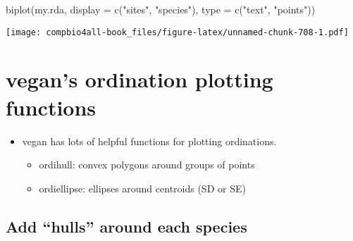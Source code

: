 \documentclass[
]{book}
\newenvironment{Shaded}{\begin{snugshade}}{\end{snugshade}}
\newcommand{\AttributeTok}[1]{\textcolor[rgb]{0.77,0.63,0.00}{#1}}
\newcommand{\CommentTok}[1]{\textcolor[rgb]{0.56,0.35,0.01}{\textit{#1}}}
\newcommand{\FunctionTok}[1]{\textcolor[rgb]{0.00,0.00,0.00}{#1}}
\newcommand{\NormalTok}[1]{#1}
\newcommand{\SpecialCharTok}[1]{\textcolor[rgb]{0.00,0.00,0.00}{#1}}
\newcommand{\StringTok}[1]{\textcolor[rgb]{0.31,0.60,0.02}{#1}}
\providecommand{\tightlist}{%
  \setlength{\itemsep}{0pt}\setlength{\parskip}{0pt}}
\begin{document}
\begin{Shaded}
\begin{Highlighting}[]
\FunctionTok{biplot}\NormalTok{(my.rda,}
       \AttributeTok{display =} \FunctionTok{c}\NormalTok{(}\StringTok{"sites"}\NormalTok{, }
                   \StringTok{"species"}\NormalTok{),}
       \AttributeTok{type =} \FunctionTok{c}\NormalTok{(}\StringTok{"text"}\NormalTok{,}
                \StringTok{"points"}\NormalTok{))}
\end{Highlighting}
\end{Shaded}

\texttt{[image: compbio4all-book\_files/figure-latex/unnamed-chunk-708-1.pdf]}

\hypertarget{vegans-ordination-plotting-functions}{%
\chapter{vegan's ordination plotting functions}\label{vegans-ordination-plotting-functions}}

\begin{itemize}
\tightlist
\item
  vegan has lots of helpful functions for plotting ordinations.

  \begin{itemize}
  \tightlist
  \item
    ordihull: convex polygons around groups of points
  \item
    ordiellipse: ellipses around centroids (SD or SE)
  \end{itemize}
\end{itemize}

\hypertarget{add-hulls-around-each-species}{%
\section{Add ``hulls'' around each species}\label{add-hulls-around-each-species}}

\begin{Shaded}
\end{Shaded}
\end{document}
